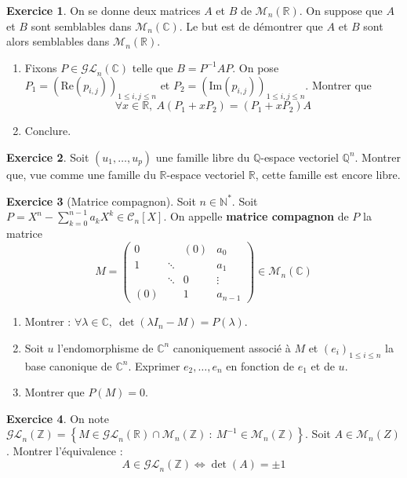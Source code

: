 \documentclass[french]{book}
\newcommand{\N}{\mathbb{N}}
\newcommand{\Z}{\mathbb{Z}}
\newcommand{\Q}{\mathbb{Q}}
\newcommand{\R}{\mathbb{R}}
\newcommand{\C}{\mathbb{C}}
\newcommand{\st}{^*}
\newcommand{\inv}{^{-1}}
\theoremstyle{definition}
\newtheorem{ex}{Exercice}[chapter]
\theoremstyle{theorem}
\theoremstyle{remark}
\begin{document}
\begin{ex}
	On se donne deux matrices $A$ et $B$ de $\mathcal{M}_n(\R)$. On suppose que $A$ et $B$ sont semblables dans $\mathcal{M}_n(\C)$. Le but est de démontrer que $A$ et $B$ sont alors semblables dans $\mathcal{M}_n(\R)$.
	\begin{enumerate}
		\item Fixons $P\in\mathcal{GL}_n(\C)$ telle que $B=P\inv AP$. On pose $P_1=(\text{Re}(p_{i,j}))_{1\leqslant i,j\leqslant n}$ et $P_2=(\text{Im}(p_{i,j}))_{1\leqslant i,j\leqslant n}$. Montrer que $$\forall x\in\R,\ A(P_1+xP_2)=(P_1+xP_2)A$$
		\item Conclure.
	\end{enumerate}
\end{ex}

\begin{ex}
	Soit $(u_1,\ldots,u_p)$ une famille libre du $\Q$-espace vectoriel $\Q^n$. Montrer que, vue comme une famille du $\R$-espace vectoriel $\R$, cette famille est encore libre.
\end{ex}

\begin{ex}[Matrice compagnon]
	Soit $n\in\N\st$. Soit $P=X^n-\displaystyle\sum_{k=0}^{n-1}a_kX^k\in\mathcal{C}_n[X]$. On appelle \textbf{matrice compagnon} de $P$ la matrice $$M=\begin{pmatrix}
		0&&(0)&a_0\\
		1&\ddots&&a_1\\
		&\ddots&0&\vdots\\
		(0)&&1&a_{n-1}
	\end{pmatrix}\in\mathcal{M}_n(\C)$$
	\begin{enumerate}
		\item Montrer : $\forall \lambda\in\C,\ \det(\lambda I_n-M)=P(\lambda)$.
		\item Soit $u$ l'endomorphisme de $\C^n$ canoniquement associé à $M$ et $(e_i)_{1\leqslant i\leqslant n}$ la base canonique de $\C^n$. Exprimer $e_2,\ldots,e_n$ en fonction de $e_1$ et de $u$.
		\item Montrer que $P(M)=0$.
	\end{enumerate}
\end{ex}

\begin{ex}
	On note $\mathcal{GL}_n(\Z)=\left\{M\in\mathcal{GL}_n(\R)\cap\mathcal{M}_n(\Z)\ : \ M\inv\in\mathcal{M}_n(\Z)\right\}$. Soit $A\in\mathcal{M}_n(Z)$. Montrer l'équivalence : $$A\in\mathcal{GL}_n(\Z)\iff\det(A)=\pm 1$$
\end{ex}
\end{document}

